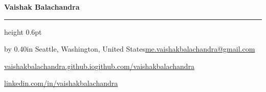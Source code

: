 \documentclass[10pt]{article}
\newenvironment{cvindent}{\par\advance\leftskip by 0.40in}{\par}
\newcommand{\cvrow}[2]{\noindent #1\hfill #2\par}
\begin{document}
\thispagestyle{empty}

{\fontsize{14pt}{17pt}\selectfont\textbf{Vaishak Balachandra}}
\vspace{3pt}
\hrule height 0.6pt
\vspace{8pt}

\begin{cvindent}
\cvrow{Seattle, Washington, United States}{\href{mailto:me.vaishakbalachandra@gmail.com}{me.vaishakbalachandra@gmail.com}}
\cvrow{\href{https://vaishakbalachandra.github.io}{vaishakbalachandra.github.io}}{\href{https://github.com/vaishakbalachandra}{github.com/vaishakbalachandra}}
\cvrow{}{\href{https://www.linkedin.com/in/vaishakbalachandra/}{linkedin.com/in/vaishakbalachandra}}
\end{cvindent}
\end{document}
